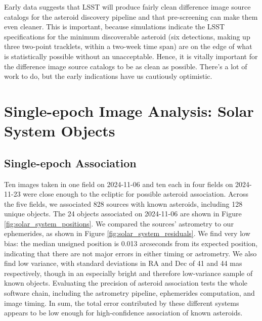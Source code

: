 Early data suggests that LSST will produce fairly clean difference image source catalogs for the asteroid discovery pipeline and that pre-screening can make them even cleaner. This is important, because simulations indicate the LSST specifications for the minimum discoverable asteroid (six detections, making up three two-point tracklets, within a two-week time span) are on the edge of what is statistically possible without an unacceptable. Hence, it is vitally important for the difference image source catalogs to be as clean as possible. There's a lot of work to do, but the early indications have us cautiously optimistic.

\section{Single-epoch Image Analysis: Solar System Objects}
\label{sec:sia_solar_system}

\subsection{Single-epoch Association}
\label{sec:association}



Ten images taken in one field on 2024-11-06 and ten each in four fields on 2024-11-23 were close enough to the ecliptic for possible asteroid association. Across the five fields, we associated 828 sources with known asteroids, including 128 unique objects. The 24 objects associated on 2024-11-06 are shown in Figure \ref{fig:solar_system_positions}. We compared the sources' astrometry to our ephemerides, as shown in Figure \ref{fig:solar_system_residuals}. We find very low bias: the median unsigned position is 0.013 arcseconds from its expected position, indicating that there are not major errors in either timing or astrometry. We also find low variance, with standard deviations in RA and Dec of 41 and 44 mas respectively, though in an especially bright and therefore low-variance sample of known objects. Evaluating the precision of asteroid association tests the whole software chain, including the astrometry pipeline, ephemerides computation, and image timing. In sum, the total error contributed by these different systems appears to be low enough for high-confidence association of known asteroids.

